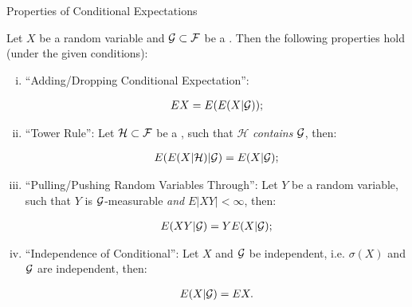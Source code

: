 \begin{theorem}{8.6}{Properties of Conditional Expectations}

    Let $X$ be a random variable and $\mathcal{G} \subset \mathcal{F}$ be a \SigmaAlgebra. Then the following properties hold (under the given conditions):

        \begin{enumerate}[(i)]
            \setlength{\parskip}{0em}
            \item ``Adding/Dropping Conditional Expectation'':

                \begin{align*}
                    EX = E(E(X|\mathcal{G}));
                \end{align*}
            \item ``Tower Rule'': Let $\mathcal{H} \subset \mathcal{F}$ be a \SigmaAlgebra, such that $\mathcal{H}$ \emph{contains} $\mathcal{G}$, then:

                \begin{align*}
                    E(E(X|\mathcal{H})|\mathcal{G}) = E(X|\mathcal{G});
                \end{align*}
            \item ``Pulling/Pushing Random Variables Through'': Let $Y$ be a random variable, such that $Y$ is $\mathcal{G}$-measurable \emph{and} $E|XY| < \infty$, then:

                \begin{align*}
                    E(XY|\mathcal{G}) = YE(X|\mathcal{G});
                \end{align*}
            \item ``Independence of Conditional'': Let $X$ and $\mathcal{G}$ be independent, i.e. $\sigma(X)$ and $\mathcal{G}$ are independent, then:

                \begin{align*}
                    E(X|\mathcal{G}) = EX.
                \end{align*}
        \end{enumerate}

\end{theorem}
